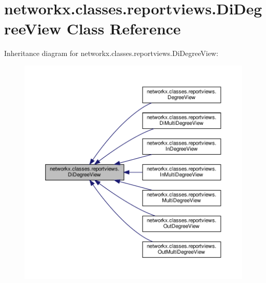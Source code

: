\hypertarget{classnetworkx_1_1classes_1_1reportviews_1_1DiDegreeView}{}\section{networkx.\+classes.\+reportviews.\+Di\+Degree\+View Class Reference}
\label{classnetworkx_1_1classes_1_1reportviews_1_1DiDegreeView}


Inheritance diagram for networkx.\+classes.\+reportviews.\+Di\+Degree\+View\+:
\nopagebreak
\begin{figure}[H]
\begin{center}
\leavevmode
\includegraphics[width=350pt]{classnetworkx_1_1classes_1_1reportviews_1_1DiDegreeView__inherit__graph}
\end{center}
\end{figure}
